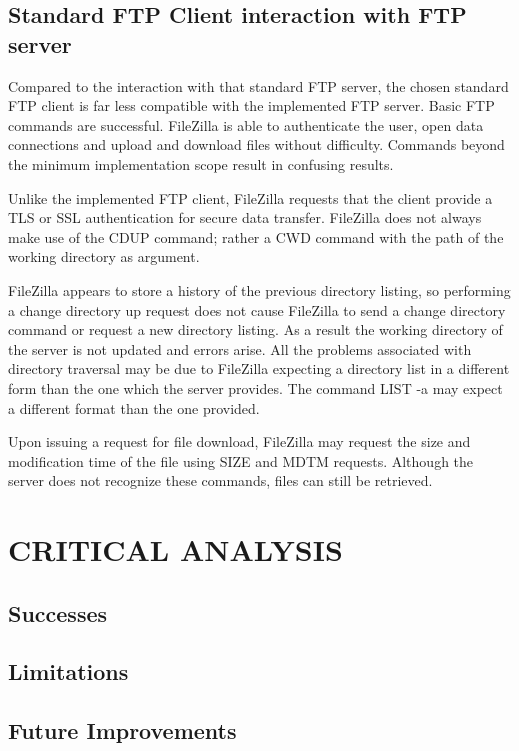 \documentclass[10pt,twocolumn]{witseiepaper}
\begin{document}
\subsection{Standard FTP Client interaction with FTP server}

Compared to the interaction with that standard FTP server, the chosen standard FTP client is far less compatible with the implemented FTP server. Basic FTP commands are successful. FileZilla is able to authenticate the user, open data connections and upload and download files without difficulty. Commands beyond the minimum implementation scope result in confusing results.

Unlike the implemented FTP client, FileZilla requests that the client provide a TLS or SSL authentication for secure data transfer. FileZilla does not always make use of the CDUP command; rather a CWD command with the path of the working directory as argument. 

FileZilla appears to store a history of the previous directory listing, so performing a change directory up request does not cause FileZilla to send a change directory command or request a new directory listing. As a result the working directory of the server is not updated and errors arise. All the problems associated with directory traversal may be due to FileZilla expecting a directory list in a different form than the one which the server provides. The command LIST -a may expect a different format than the one provided.

Upon issuing a request for file download, FileZilla may request the size and modification time of the file using SIZE and MDTM requests. Although the server does not recognize these commands, files can still be retrieved.
\section{CRITICAL ANALYSIS}

\subsection{Successes}

\subsection{Limitations}

\subsection{Future Improvements}
\end{document}
